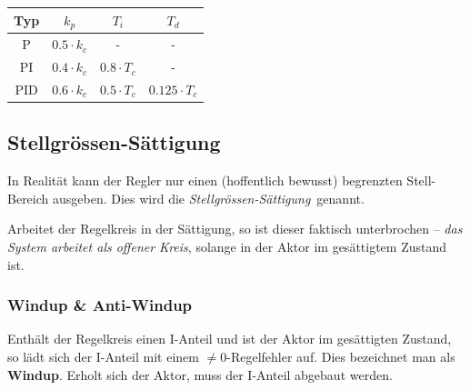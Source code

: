\documentclass[
  10pt,
  a4paper,
]{article}
\numberwithin{equation}{section}
\begin{document}
\begin{multicols}{2}
\begin{figure}[H]
{}

\end{figure}

\begin{longtable}[]{@{}cccc@{}}
\toprule\noalign{}
Typ & \(k_p\) & \(T_i\) & \(T_d\) \\
\midrule\noalign{}
\endhead
\bottomrule\noalign{}
\endlastfoot
P & \(0.5\cdot k_c\) & - & - \\
PI & \(0.4\cdot k_c\) & \(0.8\cdot T_c\) & - \\
PID & \(0.6\cdot k_c\) & \(0.5\cdot T_c\) & \(0.125\cdot T_c\) \\
\end{longtable}

\hypertarget{stellgruxf6ssen-suxe4ttigung}{%
\subsection{Stellgrössen-Sättigung}\label{stellgruxf6ssen-suxe4ttigung}}

In Realität kann der Regler nur einen (hoffentlich bewusst) begrenzten
Stell-Bereich ausgeben. Dies wird die
\emph{Stellgrössen-Sättigung}~genannt.

\begin{tcolorbox}[enhanced jigsaw, coltitle=black, arc=.35mm, breakable, opacityback=0, opacitybacktitle=0.6, rightrule=.15mm, titlerule=0mm, bottomrule=.15mm, leftrule=.75mm, bottomtitle=1mm, colframe=quarto-callout-warning-color-frame, toprule=.15mm, colbacktitle=quarto-callout-warning-color!10!white, toptitle=1mm, title=\textcolor{quarto-callout-warning-color}{\faExclamationTriangle}\hspace{0.5em}{Sättigungseffekt}, left=2mm, colback=white]

Arbeitet der Regelkreis in der Sättigung, so ist dieser faktisch
unterbrochen -- \emph{das System arbeitet als offener Kreis}, solange in
der Aktor im gesättigtem Zustand ist.

\end{tcolorbox}

\hypertarget{windup-anti-windup}{%
\subsubsection{Windup \& Anti-Windup}\label{windup-anti-windup}}

Enthält der Regelkreis einen I-Anteil und ist der Aktor im gesättigten
Zustand, so lädt sich der I-Anteil mit einem \(\neq0\)-Regelfehler auf.
Dies bezeichnet man als \textbf{Windup}. Erholt sich der Aktor, muss der
I-Anteil abgebaut werden.


\end{multicols}
\end{document}
